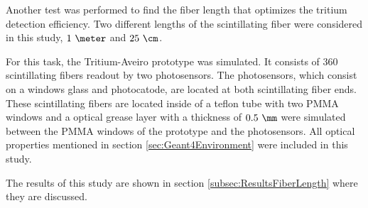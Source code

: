 Another test was performed to find the fiber length that optimizes the tritium detection efficiency. Two different lengths of the scintillating fiber were considered in this study, $1~\meter$ and $25~\cm$. 

For this task, the Tritium-Aveiro prototype was simulated. It consists of $360$ scintillating fibers readout by two photosensors. The photosensors, which consist on a windows glass and photocatode, are located at both scintillating fiber ends. These scintillating fibers are located inside of a teflon tube with two PMMA windows and a optical grease layer with a thickness of $0.5~\mm$ were simulated between the PMMA windows of the prototype and the photosensors. All optical properties mentioned in section \ref{sec:Geant4Environment} were included in this study.

The results of this study are shown in section \ref{subsec:ResultsFiberLength} where they are discussed.